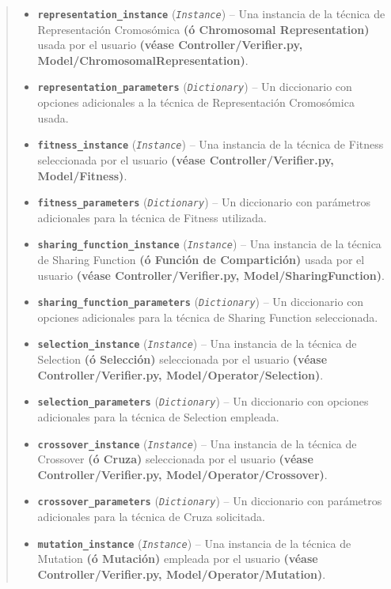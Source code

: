 \documentclass[class=report, crop=false]{standalone}
\begin{document}
\begin{fulllineitems}
\begin{quote}
\begin{description}
\begin{itemize}
\item \textbf{\texttt{representation\_instance}} (\emph{\texttt{Instance}}) -- Una instancia de la técnica de Representación Cromosómica \textbf{(ó Chromosomal Representation)} usada por el usuario \textbf{(véase Controller/Verifier.py, Model/}\break\textbf{ChromosomalRepresentation)}.
\item \textbf{\texttt{representation\_parameters}} (\emph{\texttt{Dictionary}}) -- Un diccionario con opciones adicionales a la técnica de Representación Cromosómica usada.
\item \textbf{\texttt{fitness\_instance}} (\emph{\texttt{Instance}}) -- Una instancia de la técnica de Fitness seleccionada por el usuario \textbf{(véase Controller/Verifier.py, Model/Fitness)}.
\item \textbf{\texttt{fitness\_parameters}} (\emph{\texttt{Dictionary}}) -- Un diccionario con parámetros adicionales para la técnica de Fitness utilizada.
\item \textbf{\texttt{sharing\_function\_instance}} (\emph{\texttt{Instance}}) -- Una instancia de la técnica de Sharing Function \textbf{(ó Función de Compartición)} usada por el usuario \textbf{(véase Controller/Verifier.py, Model/SharingFunction)}.
\item \textbf{\texttt{sharing\_function\_parameters}} (\emph{\texttt{Dictionary}}) -- Un diccionario con opciones adicionales para la técnica de Sharing Function seleccionada.
\item \textbf{\texttt{selection\_instance}} (\emph{\texttt{Instance}}) -- Una instancia de la técnica de Selection \textbf{(ó Selección)} seleccionada por el usuario \textbf{(véase Controller/Verifier.py, Model/Operator/}\break\textbf{Selection)}.
\item \textbf{\texttt{selection\_parameters}} (\emph{\texttt{Dictionary}}) -- Un diccionario con opciones adicionales para la técnica de Selection empleada.
\item \textbf{\texttt{crossover\_instance}} (\emph{\texttt{Instance}}) -- Una instancia de la técnica de Crossover \textbf{(ó Cruza)} seleccionada por el usuario \textbf{(véase Controller/Verifier.py, Model/Operator/}\break\textbf{Crossover)}.
\item \textbf{\texttt{crossover\_parameters}} (\emph{\texttt{Dictionary}}) -- Un diccionario con parámetros adicionales para la técnica de Cruza solicitada.
\item \textbf{\texttt{mutation\_instance}} (\emph{\texttt{Instance}}) -- Una instancia de la técnica de Mutation \textbf{(ó Mutación)} empleada por el usuario \textbf{(véase Controller/Verifier.py, Model/Operator/}\break\textbf{Mutation)}.

\end{itemize}
\end{description}
\end{quote}
\end{fulllineitems}
\end{document}
